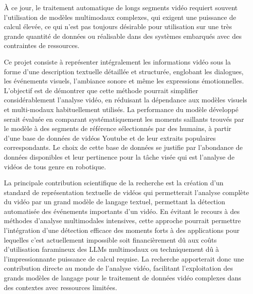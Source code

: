 À ce jour, le traitement automatique de longs segments vidéo requiert souvent l'utilisation de modèles multimodaux complexes, qui exigent une puissance de calcul élevée, ce qui n'est pas toujours désirable pour utilisation sur une très grande quantité de données ou réalisable dans des systèmes embarqués avec des contraintes de ressources.

Ce projet  consiste à représenter intégralement les informations vidéo sous la forme d'une description textuelle détaillée et structurée, englobant les dialogues, les événements visuels, l'ambiance sonore et même les expressions émotionnelles. L'objectif est de démontrer que cette méthode pourrait simplifier considérablement l'analyse vidéo, en réduisant la dépendance aux modèles visuels et multi-modaux habituellement utilisés. La performance du modèle développé serait évaluée en comparant systématiquement les moments saillants trouvés par le modèle à des segments de référence sélectionnés par des humains, à partir d'une base de données de vidéos Youtube et de leur extraits populaires correspondants. Le choix de cette base de données se justifie par l'abondance de données disponibles et leur pertinence pour la tâche visée qui est l’analyse de vidéos de tous genre en robotique.

La principale contribution scientifique de la recherche est la création d’un standard de représentation textuelle de vidéos qui permetterait l’analyse complète du vidéo par un grand modèle de langage textuel, permettant la détection automatisée des événements importants d’un vidéo. En évitant le recours à des méthodes d'analyse multimodales intensives, cette approche pourrait permettre l'intégration d'une détection efficace des moments forts à des applications pour lequelles c'est actuellement impossible soit financièrement dû aux coûts d'utilisation faramineux des LLMs multimodaux ou techniquement dû à l'impressionnante puissance de calcul requise. La recherche apporterait donc une contribution directe au monde de l'analyse vidéo, facilitant l'exploitation des grands modèles de langage pour le traitement de données vidéo complexes dans des contextes avec ressources limitées.
